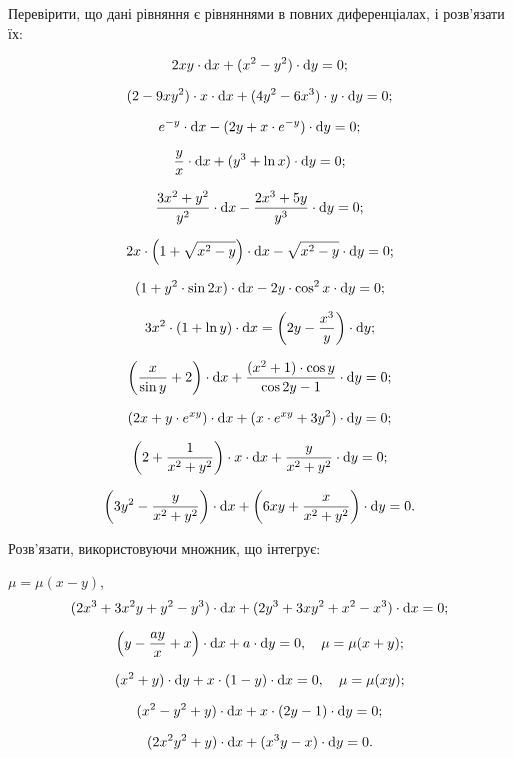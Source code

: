 Перевірити, що дані рівняння є рівняннями в повних диференціалах, і розв’язати їх:
\begin{problem}
	\[ 2 x y \cdot \mathop{}\!\mathrm{d} x + (x^2 - y^2) \cdot \mathop{}\!\mathrm{d} y = 0;\]
\end{problem}
\begin{problem}
	\[(2-9xy^2)\cdot x\cdot \mathop{}\!\mathrm{d} x + (4y^2-6x^3)\cdot y\cdot \mathop{}\!\mathrm{d} y=0;\]
\end{problem}
\begin{problem}
	\[e^{-y}\cdot\mathop{}\!\mathrm{d} x-(2y+x\cdot e^{-y})\cdot\mathop{}\!\mathrm{d} y=0;\]
\end{problem}
\begin{problem}
	\[ \frac yx\cdot\mathop{}\!\mathrm{d} x+(y^3+\ln x)\cdot\mathop{}\!\mathrm{d} y=0;\]
\end{problem}
\begin{problem}
	\[\frac{3x^2+y^2}{y^2}\cdot\mathop{}\!\mathrm{d} x-\frac{2x^3+5y}{y^3}\cdot\mathop{}\!\mathrm{d} y=0;\]
\end{problem}
\begin{problem}
	\[2x\cdot\left(1+\sqrt{x^2-y}\right)\cdot\mathop{}\!\mathrm{d} x-\sqrt{x^2-y}\cdot\mathop{}\!\mathrm{d} y=0;\]
\end{problem}
\begin{problem}
	\[(1+y^2\cdot\sin 2x)\cdot\mathop{}\!\mathrm{d} x-2y\cdot\cos^2x\cdot\mathop{}\!\mathrm{d} y=0;\]
\end{problem}
\begin{problem}
	\[3x^2\cdot(1+\ln y)\cdot\mathop{}\!\mathrm{d} x=\left(2y-\frac{x^3}y\right)\cdot\mathop{}\!\mathrm{d} y;\]
\end{problem}
\begin{problem}
	\[\left(\frac x{\sin y}+2\right)\cdot\mathop{}\!\mathrm{d} x+\frac{(x^2+1)\cdot\cos y}{\cos2y-1}\cdot\mathop{}\!\mathrm{d} y=0;\]
\end{problem}
\begin{problem}
	\[(2x+y\cdot e^{xy})\cdot\mathop{}\!\mathrm{d} x+(x\cdot e^{xy}+3y^2)\cdot\mathop{}\!\mathrm{d} y=0;\]
\end{problem}
\begin{problem}
	\[\left(2+\frac{1}{x^2+y^2}\right)\cdot x\cdot\mathop{}\!\mathrm{d} x+\frac{y}{x^2+y^2}\cdot \mathop{}\!\mathrm{d} y=0;\]
\end{problem}
\begin{problem}
	\[\left(3y^2-\frac{y}{x^2+y^2}\right)\cdot\mathop{}\!\mathrm{d} x+\left(6xy+\frac{x}{x^2+y^2}\right)\cdot \mathop{}\!\mathrm{d} y=0.\]
\end{problem}

Розв’язати, використовуючи множник, що інтегрує:
\begin{problem} $\mu=\mu(x-y)$,
	\[(2x^3+3x^2y+y^2-y^3)\cdot\mathop{}\!\mathrm{d} x+(2y^3+3xy^2+x^2-x^3)\cdot\mathop{}\!\mathrm{d} x=0;\]
\end{problem}
\begin{problem}
	\[ \left(y-\frac{ay}{x}+x\right)\cdot\mathop{}\!\mathrm{d} x+a\cdot\mathop{}\!\mathrm{d} y=0, \quad \mu=\mu(x+y);\]
\end{problem}
\begin{problem}
	\[(x^2+y)\cdot\mathop{}\!\mathrm{d} y+x\cdot(1-y)\cdot\mathop{}\!\mathrm{d} x=0, \quad \mu=\mu(xy);\]
\end{problem}
\begin{problem}
	\[(x^2-y^2+y)\cdot\mathop{}\!\mathrm{d} x+x\cdot(2y-1)\cdot\mathop{}\!\mathrm{d} y=0;\]
\end{problem}
\begin{problem}
	\[(2x^2y^2+y)\cdot\mathop{}\!\mathrm{d} x+(x^3y-x)\cdot\mathop{}\!\mathrm{d} y=0.\]
\end{problem}